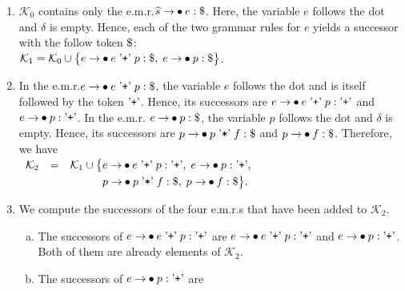 \begin{enumerate}
\item $\mathcal{K}_0$ contains only the e.m.r.\@ $\widehat{s} \rightarrow \mdot e: \symbol{36}$.  Here, the
      variable $e$ follows the dot and $\delta$ is empty.  Hence, each of the two grammar rules for $e$ yields a
      successor with the follow token $\symbol{36}$:
      \\[0.2cm]
      \hspace*{1.3cm}
      $\mathcal{K}_1 = \mathcal{K}_0 \cup \bigl\{ e \rightarrow \mdot e \aquoted{+} p: \symbol{36},\;
                                                  e \rightarrow \mdot p: \symbol{36} \bigr\}$.
\item In the e.m.r.\@ $e \rightarrow \mdot e \aquoted{+} p: \symbol{36}$, the variable $e$ follows the dot and is
      itself followed by the token $\mbox{'\texttt{+}'}$.  Hence, its successors are
      $e \rightarrow \mdot e \aquoted{+} p: \saquoted{+}$ and $e \rightarrow \mdot p: \saquoted{+}$.  In the e.m.r.\@
      $e \rightarrow \mdot p: \symbol{36}$, the variable $p$ follows the dot and $\delta$ is empty.  Hence, its
      successors are $p \rightarrow \mdot p \aquoted{*} f: \symbol{36}$ and $p \rightarrow \mdot f: \symbol{36}$.
      Therefore, we have
      \\[0.2cm]
      \hspace*{1.3cm}
      $\begin{array}[t]{lcl}
         \mathcal{K}_2 & = & \mathcal{K}_1 \cup \bigl\{ e \rightarrow \mdot e \aquoted{+} p: \saquoted{+},\;
                                                        e \rightarrow \mdot p: \saquoted{+}, \\[0.1cm]
                       &   & \hphantom{\mathcal{K}_1 \cup \bigl\{}
                                                        p \rightarrow \mdot p \aquoted{*} f: \symbol{36},\;
                                                        p \rightarrow \mdot f: \symbol{36} \bigr\}.
       \end{array}$
\item We compute the successors of the four e.m.r.s that have been added to $\mathcal{K}_2$.
      \begin{enumerate}[(a)]
      \item The successors of $e \rightarrow \mdot e \aquoted{+} p: \saquoted{+}$ are
            $e \rightarrow \mdot e \aquoted{+} p: \saquoted{+}$ and $e \rightarrow \mdot p: \saquoted{+}$.  Both of
            them are already elements of $\mathcal{K}_2$.
      \item The successors of $e \rightarrow \mdot p: \saquoted{+}$ are

\end{enumerate}
\end{enumerate}
